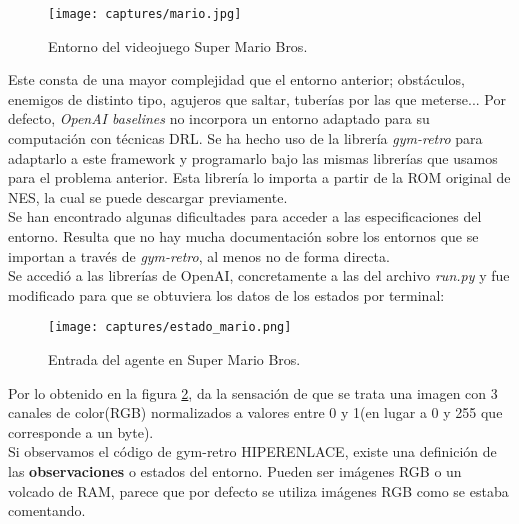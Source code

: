 \documentclass[11pt,fleqn]{book} %
\begin{document}
\begin{figure}[H]
	\centering\texttt{[image: captures/mario.jpg]}
	\caption{Entorno del videojuego Super Mario Bros.}
	\label{fig:mario} %
\end{figure}

Este consta de una mayor complejidad que el entorno anterior; obstáculos, enemigos de distinto tipo, agujeros que saltar, tuberías por las que meterse... Por defecto, \textit{OpenAI baselines} no incorpora un entorno adaptado para su computación con técnicas DRL. Se ha hecho uso de la librería \textit{gym-retro}\cite{article:gymretro} para adaptarlo a este framework y programarlo bajo las mismas librerías que usamos para el problema anterior. Esta librería lo importa a partir de la ROM original de NES, la cual se puede descargar previamente. \\

Se han encontrado algunas dificultades para acceder a las especificaciones del entorno. Resulta que no hay mucha documentación sobre los entornos que se importan a través de \textit{gym-retro}, al menos no de forma directa. \\

Se accedió a las librerías de OpenAI, concretamente a las del archivo \textit{run.py} y fue modificado para que se obtuviera los datos de los estados por terminal:

\begin{figure}[H]
	\centering\texttt{[image: captures/estado\_mario.png]}
	\caption{Entrada del agente en Super Mario Bros.}
	\label{fig:entradamario} %
\end{figure}

Por lo obtenido en la figura \ref{fig:entradamario}, da la sensación de que se trata una imagen con 3 canales de color(RGB) normalizados a valores entre 0 y 1(en lugar a 0 y 255 que corresponde a un byte). \\

Si observamos el código de gym-retro HIPERENLACE, existe una definición de las \textbf{observaciones} o estados del entorno. Pueden ser imágenes RGB o un volcado de RAM, parece que por defecto se utiliza imágenes RGB como se estaba comentando. \\
\end{document}
